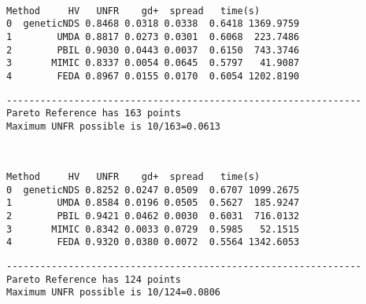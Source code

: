 \documentclass[11pt]{article}
\begin{document}
    \begin{center}
    \end{center}
    { \hspace*{\fill} \\}
    
    
    \begin{Verbatim}[commandchars=\\\{\}]
       Method     HV   UNFR    gd+  spread   time(s)
0  geneticNDS 0.8468 0.0318 0.0338  0.6418 1369.9759
1        UMDA 0.8817 0.0273 0.0301  0.6068  223.7486
2        PBIL 0.9030 0.0443 0.0037  0.6150  743.3746
3       MIMIC 0.8337 0.0054 0.0645  0.5797   41.9087
4        FEDA 0.8967 0.0155 0.0170  0.6054 1202.8190
    \end{Verbatim}

    
    \begin{Verbatim}[commandchars=\\\{\}]
---------------------------------------------------------------
Pareto Reference has 163 points
Maximum UNFR possible is 10/163=0.0613
    \end{Verbatim}

    \begin{center}
    \end{center}
    { \hspace*{\fill} \\}
    
    
    \begin{Verbatim}[commandchars=\\\{\}]
       Method     HV   UNFR    gd+  spread   time(s)
0  geneticNDS 0.8252 0.0247 0.0509  0.6707 1099.2675
1        UMDA 0.8584 0.0196 0.0505  0.5627  185.9247
2        PBIL 0.9421 0.0462 0.0030  0.6031  716.0132
3       MIMIC 0.8342 0.0033 0.0729  0.5985   52.1515
4        FEDA 0.9320 0.0380 0.0072  0.5564 1342.6053
    \end{Verbatim}

    
    \begin{Verbatim}[commandchars=\\\{\}]
---------------------------------------------------------------
Pareto Reference has 124 points
Maximum UNFR possible is 10/124=0.0806
    \end{Verbatim}

    \begin{center}
    \end{center}
    { \hspace*{\fill} \\}
    
\end{document}
